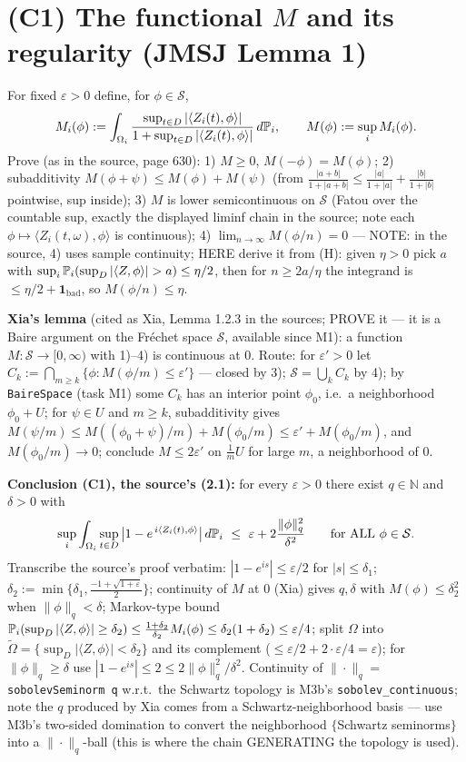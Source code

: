\documentclass[11pt]{article}
\theoremstyle{plain}
\theoremstyle{remark}
\newcommand{\eps}{\varepsilon}\newcommand{\Sch}{\mathcal{S}}
\newcommand{\ip}[2]{\langle #1,#2\rangle}
\begin{document}
\section*{(C1) The functional $M$ and its regularity (JMSJ Lemma 1)}

For fixed $\eps>0$ define, for $\phi\in\Sch$,
\[
M_i(\phi):=\int_{\Omega_i}
\frac{\sup_{t\in D}|\ip{Z_i(t)}{\phi}|}{1+\sup_{t\in D}|\ip{Z_i(t)}{\phi}|}
\,d\PP_i,\qquad M(\phi):=\sup_iM_i(\phi).
\]
Prove (as in the source, page 630): 1) $M\ge0$, $M(-\phi)=M(\phi)$;
2) subadditivity $M(\phi+\psi)\le M(\phi)+M(\psi)$ (from
$\frac{|a+b|}{1+|a+b|}\le\frac{|a|}{1+|a|}+\frac{|b|}{1+|b|}$ pointwise,
sup inside); 3) $M$ is lower semicontinuous on $\Sch$ (Fatou over the
countable sup, exactly the displayed liminf chain in the source; note
each $\phi\mapsto\ip{Z_i(t,\omega)}{\phi}$ is continuous); 4)
$\lim_{n\to\infty}M(\phi/n)=0$ --- NOTE: in the source, 4) uses sample
continuity; HERE derive it from (H): given $\eta>0$ pick $a$ with
$\sup_i\PP_i(\sup_D|\ip{Z}{\phi}|>a)\le\eta/2$, then for $n\ge2a/\eta$
the integrand is $\le\eta/2+ \mathbf 1_{\text{bad}}$, so $M(\phi/n)\le\eta$.

\textbf{Xia's lemma} (cited as Xia, Lemma 1.2.3 in the sources; PROVE it
--- it is a Baire argument on the Fr\'echet space $\Sch$, available since
M1): a function $M:\Sch\to[0,\infty)$ with 1)--4) is continuous at $0$.
Route: for $\eps'>0$ let $C_k:=\bigcap_{m\ge k}\{\phi:M(\phi/m)\le\eps'\}$
--- closed by 3); $\Sch=\bigcup_kC_k$ by 4); by \texttt{BaireSpace}
(task M1) some $C_k$ has an interior point $\phi_0$, i.e.\ a neighborhood
$\phi_0+U$; for $\psi\in U$ and $m\ge k$, subadditivity gives
$M(\psi/m)\le M((\phi_0+\psi)/m)+M(\phi_0/m)\le\eps'+M(\phi_0/m)$, and
$M(\phi_0/m)\to0$; conclude $M\le2\eps'$ on $\frac1mU$ for large $m$, a
neighborhood of $0$.

\textbf{Conclusion (C1), the source's (2.1):} for every $\eps>0$ there
exist $q\in\mathbb N$ and $\delta>0$ with
\[
\sup_i\int_{\Omega_i}\sup_{t\in D}\big|1-e^{\,i\ip{Z_i(t)}{\phi}}\big|
\,d\PP_i\ \le\ \eps+2\frac{\|\phi\|_q^2}{\delta^2}
\qquad\text{for ALL }\phi\in\Sch .
\]
Transcribe the source's proof verbatim: $|1-e^{is}|\le\eps/2$ for
$|s|\le\delta_1$; $\delta_2:=\min\{\delta_1,\frac{-1+\sqrt{1+\eps}}2\}$;
continuity of $M$ at $0$ (Xia) gives $q,\delta$ with
$M(\phi)\le\delta_2^2$ when $\|\phi\|_q<\delta$; Markov-type bound
$\PP_i(\sup_D|\ip{Z}{\phi}|\ge\delta_2)\le\frac{1+\delta_2}{\delta_2}
M_i(\phi)\le\delta_2(1+\delta_2)\le\eps/4$; split $\Omega$ into
$\tilde\Omega=\{\sup_D|\ip{Z}{\phi}|<\delta_2\}$ and its complement
($\le\eps/2+2\cdot\eps/4=\eps$); for $\|\phi\|_q\ge\delta$ use
$|1-e^{is}|\le2\le2\|\phi\|_q^2/\delta^2$. Continuity of
$\|\cdot\|_q=$ \texttt{sobolevSeminorm q} w.r.t.\ the Schwartz topology
is M3b's \texttt{sobolev\_continuous}; note the $q$ produced by Xia comes
from a Schwartz-neighborhood basis --- use M3b's two-sided domination to
convert the neighborhood $\{$Schwartz seminorms$\}$ into a
$\|\cdot\|_q$-ball (this is where the chain GENERATING the topology is
used).
\end{document}
